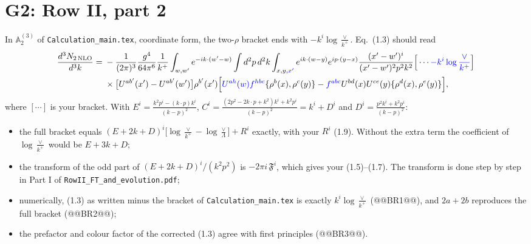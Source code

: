 \documentclass[10pt]{article}
\numberwithin{equation}{section}
\def\mf#1{\mathbb{#1}}
\newcommand{\new}[1]{{\color{blue}#1}}
\begin{document}
\section{G2: Row II, part 2}\label{sec:G2}
In $\mf A^{(3)}_2$ of \texttt{Calculation\_main.tex}, coordinate form, the two-$\rho$ bracket ends with $-k^i\log\frac{\vee}{k^+}$. Eq.~(1.3) should read
\begin{align}
\frac{d^3N_{2\,\rm NLO}}{d^3k}={}&-\frac{1}{(2\pi)^3}\frac{g^4}{64\pi^6}\frac{1}{k^+}\int_{w,w'}e^{-ik\cdot(w'-w)}\int d^2p\,d^2k\int_{x,y,\new{x'}}e^{ik\cdot(w-y)}e^{ip\cdot(y-x)}\frac{(x'-w')^i}{(x'-w')^2p^2k^2}\Big[\cdots\new{-k^i\log\frac{\vee}{k^+}}\Big]\notag\\
&\times\big[U^{ab'}(x')-U^{ab'}(w')\big]\rho^{b'}(x')\Big[\new{U^{ah}(w)f^{hbc}}\{\rho^b(x),\rho^c(y)\}-\new{f^{abc}}U^{bd}(x)U^{ce}(y)\{\rho^d(x),\rho^e(y)\}\Big],
\end{align}
where $[\cdots]$ is your bracket. With $E^i=\frac{k^2p^i-(k\cdot p)k^i}{(k-p)^2}$, $C^i=\frac{(2p^2-2k\cdot p+k^2)k^i+k^2p^i}{(k-p)^2}=k^i+D^i$ and $D^i=\frac{p^2k^i+k^2p^i}{(k-p)^2}$:
\begin{itemize}
\item the full bracket equals $(E+2k+D)^i\big[\log\frac{\vee}{k^+}-\log\frac{\vee}{\Lambda}\big]+R^i$ exactly, with your $R^i$ (1.9). Without the extra term the coefficient of $\log\frac{\vee}{k^+}$ would be $E+3k+D$;
\item the transform of the odd part of $(E+2k+D)^i/(k^2p^2)$ is $-2\pi i\,\mathfrak F^i$, which gives your (1.5)--(1.7). The transform is done step by step in Part I of \texttt{RowII\_FT\_and\_\allowbreak evolution.pdf};
\item numerically, (1.3) as written minus the bracket of \texttt{Calculation\_main.tex} is exactly $k^i\log\frac{\vee}{k^+}$ (@@BR1@@), and $2a+2b$ reproduces the full bracket (@@BR2@@);
\item the prefactor and colour factor of the corrected (1.3) agree with first principles (@@BR3@@).
\end{itemize}

\end{document}
